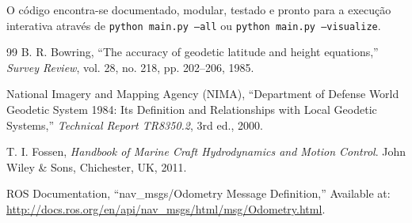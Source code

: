 \documentclass[11pt,a4paper]{article}
\begin{document}
O código encontra-se documentado, modular, testado e pronto para a execução interativa através de \texttt{python main.py --all} ou \texttt{python main.py --visualize}.

\begin{thebibliography}{99}
B. R. Bowring, ``The accuracy of geodetic latitude and height equations,'' \textit{Survey Review}, vol. 28, no. 218, pp. 202--206, 1985.

National Imagery and Mapping Agency (NIMA), ``Department of Defense World Geodetic System 1984: Its Definition and Relationships with Local Geodetic Systems,'' \textit{Technical Report TR8350.2}, 3rd ed., 2000.

T. I. Fossen, \textit{Handbook of Marine Craft Hydrodynamics and Motion Control}. John Wiley \& Sons, Chichester, UK, 2011.

ROS Documentation, ``nav\_msgs/Odometry Message Definition,'' Available at: \url{http://docs.ros.org/en/api/nav_msgs/html/msg/Odometry.html}.
\end{thebibliography}
\end{document}
